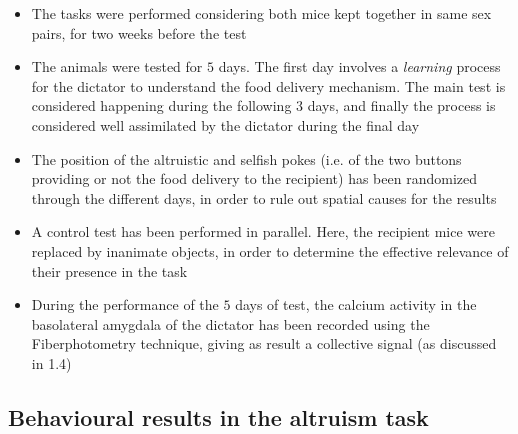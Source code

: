 \documentclass[a4paper]{article}
\begin{document}
\begin{itemize}
	
	\item The tasks were performed considering both mice kept together in same sex pairs, for two weeks before the test
	
	\item The animals were tested for $5$ days. The first day involves a \textit{learning} process for the dictator to understand the food delivery mechanism. The main test is considered happening during the following $3$ days, and finally the process is considered well assimilated by the dictator during the final day	
	
	\item The position of the altruistic and selfish pokes (i.e. of the two buttons providing or not the food delivery to the recipient) has been randomized through the different days, in order to rule out spatial causes for the results
	
	\item A control test has been performed in parallel. Here, the recipient mice were replaced by inanimate objects, in order to determine the effective relevance of their presence in the task
	
	\item During the performance of the $5$ days of test, the calcium activity in the basolateral amygdala of the dictator has been recorded using the Fiberphotometry technique, giving as result a collective signal (as discussed in 1.4)
	
\end{itemize}



\subsection{Behavioural results in the altruism task}
\end{document}
